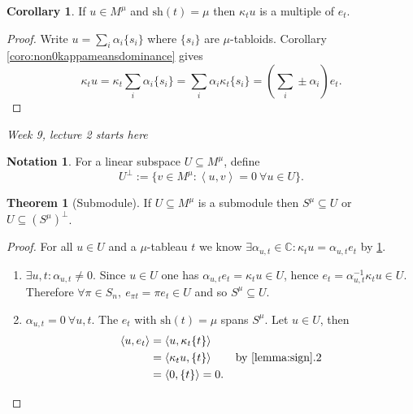 \documentclass{article}
\newcommand{\la}{\left\langle}
\newcommand{\ra}{\right\rangle}
\newcommand{\C}{\mathbb{C}}
\newcommand{\sh}{\text{sh}}
\theoremstyle{definition}
\newtheorem{thm}[defn]{Theorem}
\newtheorem{coro}[defn]{Corollary}
\newtheorem*{notation}{Notation}
\begin{document}
\begin{coro}
\label{coro:kappatuismultofet}
If $u\in M^\mu$ and $\sh(t)=\mu$ then $\kappa_t u$ is a multiple of $e_t$.
\end{coro}
\begin{proof}
Write $u=\sum_i\alpha_i\{s_i\}$ where $\{s_i\}$ are $\mu$-tabloids. Corollary \ref{coro:non0kappameansdominance} gives
\[
\kappa_t u=\kappa_t \sum_i \alpha_i\{s_i\}=\sum_i\alpha_i\kappa_t\{s_i\}=\left(\sum_i\pm \alpha_i\right) e_t.
\]
\end{proof}

\begin{flushright}
\textit{Week 9, lecture 2 starts here}
\end{flushright}

\begin{notation}
For a linear subspace $U\subseteq M^\mu$, define
\[
U^\perp :=\{v\in M^\mu:\la u,v\ra=0 \ \forall u\in U\}.
\]
\end{notation}

\begin{thm}[Submodule]
\label{thm:submodule}
If $U\subseteq M^\mu$ is a submodule then $S^\mu\subseteq U$ or $U\subseteq (S^\mu)^\perp$.
\end{thm}
\begin{proof}
For all $u\in U$ and a $\mu$-tableau $t$ we know $\exists\alpha_{u,t}\in\C:\kappa_t u=\alpha_{u,t}e_t$ by \ref{coro:kappatuismultofet}.
\begin{enumerate}
\item[Case 1:] $\exists u,t:\alpha_{u,t}\neq 0$. Since $u\in U$ one has $\alpha_{u,t}e_t=\kappa_t u\in U$, hence $e_t=\alpha_{u,t}^{-1}\kappa_t u\in U$. Therefore $\forall\pi\in S_n,\ e_{\pi t}=\pi e_t\in U$ and so $S^\mu\subseteq U$.
\item[Case 2:] $\alpha_{u,t}=0 \ \forall u,t$. The $e_t$ with $\sh(t)=\mu$ spans $S^\mu$. Let $u\in U$, then
\[
\begin{aligned}
\la u,e_t\ra&=\la u,\kappa_t\{t\}\ra\\
&=\la\kappa_t u,\{t\}\ra \qquad \text{by \ref{lemma:sign}.2}\\
&=\la 0,\{t\}\ra=0.
\end{aligned}
\]
\end{enumerate}
\end{proof}
\end{document}
